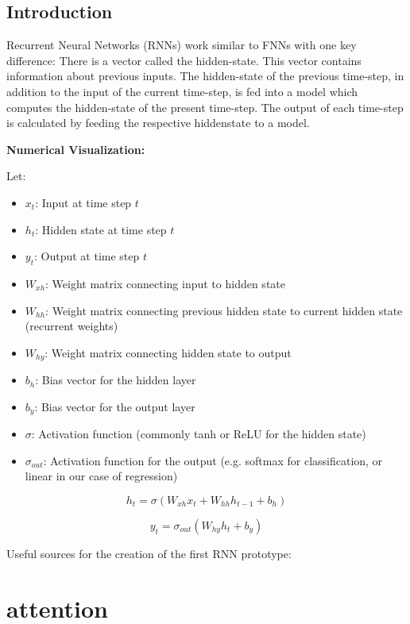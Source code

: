 \documentclass{article}
\begin{document}
\subsection{Introduction}
Recurrent Neural Networks (RNNs) work similar to FNNs with one key 
difference: There is a vector called the hidden-state. This vector contains 
information about previous inputs. The hidden-state of the previous 
time-step, in addition to the input of the current time-step, is fed into a 
model which computes the hidden-state of the present time-step. The output 
of each time-step is calculated by feeding the respective hiddenstate to a 
model.

\newpage
\textbf{ Numerical Visualization:}


Let:
\begin{itemize}
    \item $x_t$: Input at time step $t$
    \item $h_t$: Hidden state at time step $t$
    \item $y_t$: Output at time step $t$
    \item $W_{xh}$: Weight matrix connecting input to hidden state
    \item $W_{hh}$: Weight matrix connecting previous hidden state to current hidden state (recurrent weights)
    \item $W_{hy}$: Weight matrix connecting hidden state to output
    \item $b_h$: Bias vector for the hidden layer
    \item $b_y$: Bias vector for the output layer
    \item $\sigma$: Activation function (commonly tanh or ReLU for the hidden state)
    \item $\sigma_{out}$: Activation function for the output (e.g. softmax for classification, or linear in our case of regression)
\end{itemize}



$$h_t = \sigma(W_{xh}x_t + W_{hh}h_{t-1} + b_h)$$

$$y_t = \sigma_{out}(W_{hy}h_t + b_y)$$



Useful sources for the creation of the first RNN prototype:
\newpage

\section{attention}

\end{document}
